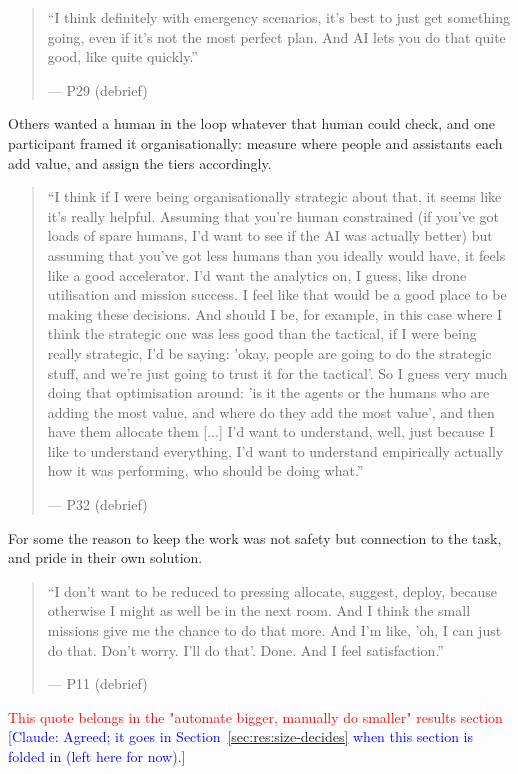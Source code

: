 \begin{quote}\small
``I think definitely with emergency scenarios, it's best to just get something going, even if it's not the most perfect plan. And AI lets you do that quite good, like quite quickly.''\par\hfill--- P29 (debrief)
\end{quote}


\label{sec:qual:who-decides:loop}
Others wanted a human in the loop whatever that human could check, and one participant framed it organisationally: measure where people and assistants each add value, and assign the tiers accordingly.

\begin{quote}\small
``I think if I were being organisationally strategic about that, it seems like it's really helpful. Assuming that you're human constrained (if you've got loads of spare humans, I'd want to see if the AI was actually better) but assuming that you've got less humans than you ideally would have, it feels like a good accelerator. I'd want the analytics on, I guess, like drone utilisation and mission success. I feel like that would be a good place to be making these decisions. And should I be, for example, in this case where I think the strategic one was less good than the tactical, if I were being really strategic, I'd be saying: 'okay, people are going to do the strategic stuff, and we're just going to trust it for the tactical'. So I guess very much doing that optimisation around: 'is it the agents or the humans who are adding the most value, and where do they add the most value', and then have them allocate them [...] I'd want to understand, well, just because I like to understand everything, I'd want to understand empirically actually how it was performing, who should be doing what.''\par\hfill--- P32 (debrief)
\end{quote}


\label{sec:qual:who-decides:ownership}
For some the reason to keep the work was not safety but connection to the task, and pride in their own solution.

\begin{quote}\small
``I don't want to be reduced to pressing allocate, suggest, deploy, because otherwise I might as well be in the next room. And I think the small missions give me the chance to do that more. And I'm like, 'oh, I can just do that. Don't worry. I'll do that'. Done. And I feel satisfaction.''\par\hfill--- P11 (debrief)
\end{quote}
\textcolor{red}{This quote belongs in the "automate bigger, manually do smaller" results section}
\textcolor{blue}{[Claude: Agreed; it goes in Section~\ref{sec:res:size-decides} when this section is folded in (left here for now).]}

